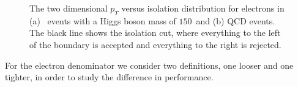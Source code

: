 \documentclass{cmspaper}
\begin{document}
\begin{figure}[htb]
  \begin{center}
    
    \caption{The two dimensional $p_T$ versus isolation distribution for electrons in (a) \HiggsToWW\ events with a Higgs boson mass of $150$~\GeVcc and (b) QCD events. The black line shows the isolation cut, where everything to the left of the boundary is accepted and everything to the right is rejected.}
    \label{fig:pt_iso_el_h150ww}
  \end{center}
\end{figure}


For the electron denominator we consider two definitions, one looser and one tighter, in order to study the difference in performance.
\end{document}

